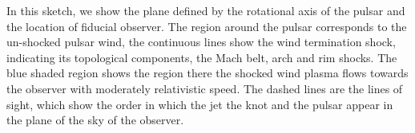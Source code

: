 \label{knot-mhd-model}{In this sketch, we show the plane defined by the rotational axis of the pulsar and the location of fiducial  observer.  The region around the pulsar corresponds to the un-shocked  pulsar wind, the continuous lines show the wind termination shock, indicating its topological components, the Mach belt, arch and rim shocks. The blue shaded region shows the region there the shocked wind plasma flows towards the observer with moderately relativistic speed. The dashed lines are the lines of sight, which show the order in which the jet the knot and the pulsar appear in the plane of the sky of the observer.   
}